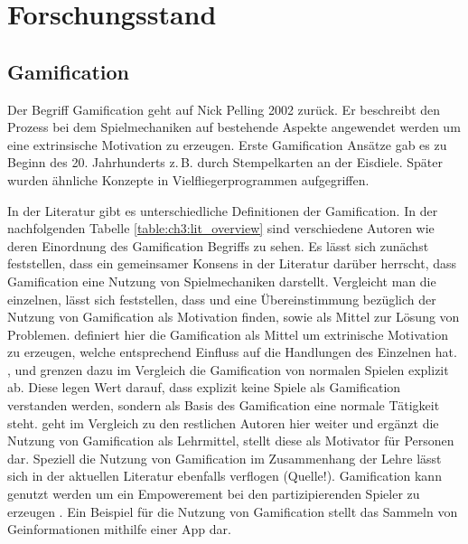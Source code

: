 \chapter{Forschungsstand}
\label{ch3:Forschungsstand}

\section{Gamification}
\label{ch3:s:Gamification}

Der Begriff Gamification geht auf Nick Pelling 2002 zurück.
Er beschreibt den Prozess bei dem Spielmechaniken auf bestehende Aspekte angewendet werden um eine extrinsische Motivation zu erzeugen.\citep{Marczewski.2013}
Erste Gamification Ansätze gab es zu Beginn des 20. Jahrhunderts z.\,B. durch Stempelkarten an der Eisdiele. Später wurden ähnliche Konzepte in Vielfliegerprogrammen aufgegriffen.

In der Literatur gibt es unterschiedliche Definitionen der Gamification.
In der nachfolgenden Tabelle \ref{table:ch3:lit_overview} sind verschiedene Autoren wie deren Einordnung des Gamification Begriffs zu sehen.
Es lässt sich zunächst feststellen, dass ein gemeinsamer Konsens in der Literatur darüber herrscht, dass Gamification eine Nutzung von Spielmechaniken darstellt.
Vergleicht man die einzelnen, lässt sich feststellen, dass \cite{Zichermann.2011} und \cite{Kapp.2012} eine Übereinstimmung bezüglich der Nutzung von Gamification als Motivation finden, sowie als Mittel zur Lösung von Problemen. \cite{Zichermann.2011} definiert hier die Gamification als Mittel um extrinische Motivation zu erzeugen, welche entsprechend Einfluss auf die Handlungen des Einzelnen hat.
\cite{Deterding.2011}, \cite{Breuer.2011} und \cite{Oxford.2013} grenzen dazu im Vergleich die Gamification von normalen Spielen explizit ab. Diese legen Wert darauf, dass explizit keine Spiele als Gamification verstanden werden, sondern als Basis des Gamification eine normale Tätigkeit steht.
\cite{Kapp.2012} geht im Vergleich zu den restlichen Autoren hier weiter und ergänzt die Nutzung von Gamification als Lehrmittel, stellt diese als Motivator für Personen dar. Speziell die Nutzung von Gamification im Zusammenhang der Lehre lässt sich in der aktuellen Literatur ebenfalls verflogen (Quelle!).
Gamification kann genutzt werden um ein Empowerement bei den partizipierenden Spieler zu erzeugen \cite{Jeannerod.2003}. 
Ein Beispiel für die Nutzung von Gamification stellt das Sammeln von Geinformationen mithilfe einer App dar. \citep{Odobasic.2013}

